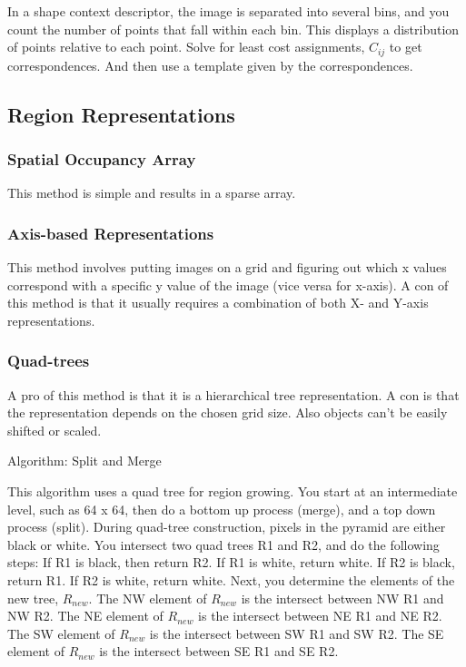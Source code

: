 \documentclass{article}
\begin{document}
\begin{multicols}{2}
  \vspace{5mm}

  In a shape context descriptor, the image is separated into several bins, and you count the number of points that fall within each bin. This displays a distribution of points relative to each point.
  Solve for least cost assignments, $C_{ij}$ to get correspondences. And then use a template given by the correspondences.

 \subsection{Region Representations}
 \subsubsection{Spatial Occupancy Array}

  This method is simple and results in a sparse array.

 \subsubsection{Axis-based Representations}

  This method involves putting images on a grid and figuring out which x values correspond with a specific y value of the image (vice versa for x-axis).
  A con of this method is that it usually requires a combination of both X- and Y-axis representations.

 \subsubsection{Quad-trees}

  A pro of this method is that it is a hierarchical tree representation. A con is that the representation depends on the chosen grid size. Also objects can't be easily shifted or scaled.
  
  \vspace{5mm}

  Algorithm: Split and Merge

  \vspace{5mm}

  This algorithm uses a quad tree for region growing. You start at an intermediate level, such as 64 x 64, then do a bottom up process (merge), and a top down process (split).
  During quad-tree construction, pixels in the pyramid are either black or white.
  You intersect two quad trees R1 and R2, and do the following steps:
  If R1 is black, then return R2. If R1 is white, return white. If R2 is black, return R1. If R2 is white, return white.
  Next, you determine the elements of the new tree, $R_{new}$.
  The NW element of $R_{new}$ is the intersect between NW R1 and NW R2.
  The NE element of $R_{new}$ is the intersect between NE R1 and NE R2.
  The SW element of $R_{new}$ is the intersect between SW R1 and SW R2.
  The SE element of $R_{new}$ is the intersect between SE R1 and SE R2.


\end{multicols}
\end{document}

